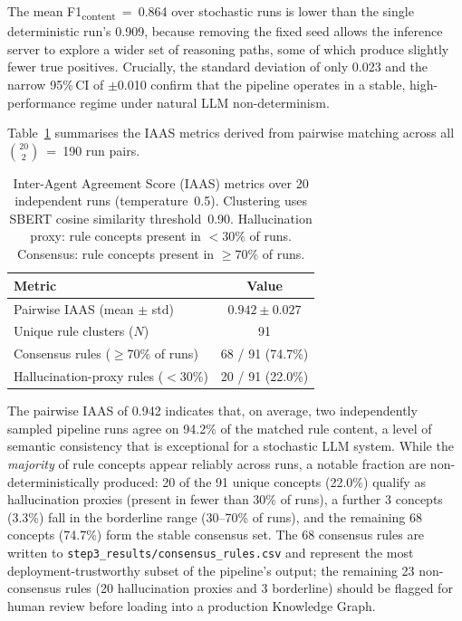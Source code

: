 ﻿\documentclass[11pt]{article}
\begin{document}
\noindent The mean F1\textsubscript{content}~=~0.864 over stochastic runs is
lower than the single deterministic run's 0.909, because removing the fixed seed
allows the inference server to explore a wider set of reasoning paths, some of
which produce slightly fewer true positives.
Crucially, the standard deviation of only 0.023 and the narrow 95\%\,CI of
$\pm$0.010 confirm that the pipeline operates in a stable, high-performance regime
under natural LLM non-determinism.

Table~\ref{tab:iaas_results} summarises the IAAS metrics derived from pairwise
matching across all $\binom{20}{2}$~=~190 run pairs.

\begin{table}[htbp]
\centering
\caption{Inter-Agent Agreement Score (IAAS) metrics over 20 independent runs
         (temperature~0.5). Clustering uses SBERT cosine similarity threshold~0.90.
         Hallucination proxy: rule concepts present in $<30\%$ of runs.
         Consensus: rule concepts present in $\geq70\%$ of runs.}
\label{tab:iaas_results}
\begin{tabular}{@{}lc@{}}
\toprule
\textbf{Metric} & \textbf{Value} \\
\midrule
Pairwise IAAS (mean $\pm$ std)       & $0.942 \pm 0.027$ \\
Unique rule clusters ($N$)           & 91 \\
Consensus rules ($\geq$70\% of runs) & 68 / 91 \quad (74.7\%) \\
Hallucination-proxy rules ($<$30\%)  & 20 / 91 \quad (22.0\%) \\
\bottomrule
\end{tabular}
\end{table}

\noindent The pairwise IAAS of 0.942 indicates that, on average, two independently
sampled pipeline runs agree on 94.2\% of the matched rule content, a level of
semantic consistency that is exceptional for a stochastic LLM system.
While the \emph{majority} of rule concepts appear reliably across runs, a notable 
fraction are non-deterministically produced: 20 of the 91 unique concepts (22.0\%) 
qualify as hallucination proxies (present in fewer than 30\% of runs), a further 
3 concepts (3.3\%) fall in the borderline range (30--70\% of runs), and the remaining 
68 concepts (74.7\%) form the stable consensus set.
The 68 consensus rules are written to \texttt{step3\_results/consensus\_rules.csv}
and represent the most deployment-trustworthy subset of the pipeline's output;
the remaining 23 non-consensus rules (20 hallucination proxies and 3 borderline)
should be flagged for human review before loading into a production Knowledge Graph.
\end{document}
